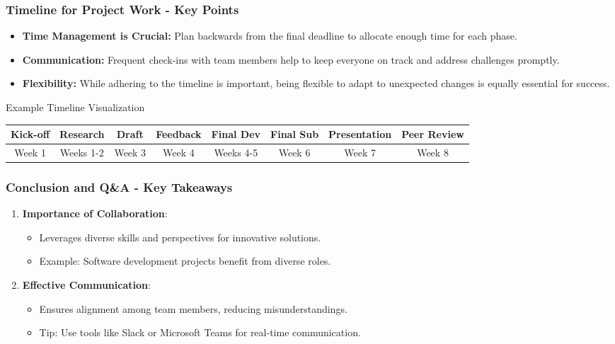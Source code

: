 \documentclass[aspectratio=169]{beamer}
\begin{document}
\begin{frame}[fragile]
    \frametitle{Timeline for Project Work - Key Points}
    \begin{itemize}
        \item \textbf{Time Management is Crucial:} Plan backwards from the final deadline to allocate enough time for each phase.
        \item \textbf{Communication:} Frequent check-ins with team members help to keep everyone on track and address challenges promptly.
        \item \textbf{Flexibility:} While adhering to the timeline is important, being flexible to adapt to unexpected changes is equally essential for success.
    \end{itemize}
    
    \begin{block}{Example Timeline Visualization}
        \begin{center}
        \begin{tabular}{|c|c|c|c|c|c|c|c|}
            \hline
            Kick-off & Research & Draft & Feedback & Final Dev & Final Sub & Presentation & Peer Review \\
            \hline
            Week 1 & Weeks 1-2 & Week 3 & Week 4 & Weeks 4-5 & Week 6 & Week 7 & Week 8 \\
            \hline
        \end{tabular}
        \end{center}
    \end{block}
\end{frame}

\begin{frame}[fragile]
    \frametitle{Conclusion and Q\&A - Key Takeaways}
    \begin{enumerate}
        \item \textbf{Importance of Collaboration}:
        \begin{itemize}
            \item Leverages diverse skills and perspectives for innovative solutions.
            \item Example: Software development projects benefit from diverse roles.
        \end{itemize}
        
        \item \textbf{Effective Communication}:
        \begin{itemize}
            \item Ensures alignment among team members, reducing misunderstandings.
            \item Tip: Use tools like Slack or Microsoft Teams for real-time communication.
        \end{itemize}
    \end{enumerate}
\end{frame}
\end{document}
